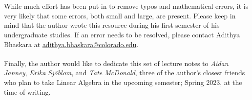 \vphantom
\\
\\
While much effort has been put in to remove typos and mathematical errors, it is very likely that some errors, both small and large, are present. Please keep in mind that the author wrote this resource during his first semester of his undergraduate studies. If an error needs to be resolved, please contact Adithya Bhaskara at \href{mailto:adithya.bhaskara@colorado.edu}{adithya.bhaskara@colorado.edu}.
\\
\\
Finally, the author would like to dedicate this set of lecture notes to \textit{Aidan Janney}, \textit{Erika Sj\"{o}blom}, and \textit{Tate McDonald}, three of the author's closest friends who plan to take Linear Algebra in the upcoming semester; Spring 2023, at the time of writing.
\\
\\
\vfill
{}